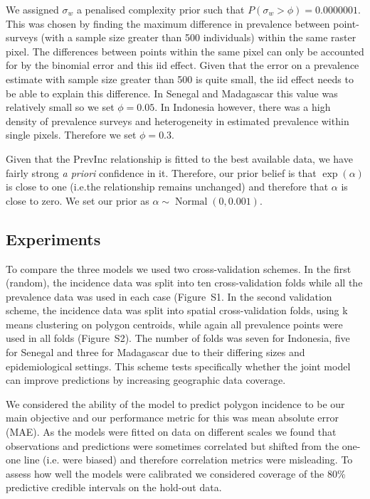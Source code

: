 \documentclass{statsoc}
\begin{document}
We assigned $\sigma_w$ a penalised complexity prior such that $P(\sigma_w > \phi) = 0.0000001$. 
This was chosen by finding the maximum difference in prevalence between point-surveys (with a sample size greater than 500 individuals) within the same raster pixel.
The differences between points within the same pixel can only be accounted for by the binomial error and this iid effect.
Given that the error on a prevalence estimate with sample size greater than 500 is quite small, the iid effect needs to be able to explain this difference.
In Senegal and Madagascar this value was relatively small so we set $\phi = 0.05$. 
In Indonesia however, there was a high density of prevalence surveys and heterogeneity in estimated prevalence within single pixels.
Therefore we set $\phi = 0.3$.

Given that the PrevInc relationship is fitted to the best available data, we have fairly strong \emph{a priori} confidence in it.
Therefore, our prior belief is that $\exp(\alpha)$ is close to one (i.e.\thinspace the relationship remains unchanged) and therefore that $\alpha$ is close to zero.
We set our prior as $\alpha \sim \operatorname{Normal}(0, 0.001)$.


\subsection*{Experiments}

To compare the three models we used two cross-validation schemes. 
In the first (random), the incidence data was split into ten cross-validation folds while all the prevalence data was used in each case (Figure~S1. 
In the second validation scheme, the incidence data was split into spatial cross-validation folds, using k means clustering on polygon centroids, while again all prevalence points were used in all folds (Figure~S2).
The number of folds was seven for Indonesia, five for Senegal and three for Madagascar due to their differing sizes and epidemiological settings.
This scheme tests specifically whether the joint model can improve predictions by increasing geographic data coverage.


We considered the ability of the model to predict polygon incidence to be our main objective and our performance metric for this was mean absolute error (MAE).
As the models were fitted on data on different scales we found that observations and predictions were sometimes correlated but shifted from the one-one line (i.e. were biased) and therefore correlation metrics were misleading.
To assess how well the models were calibrated we considered coverage of the 80\% predictive credible intervals on the hold-out data.
\end{document}
